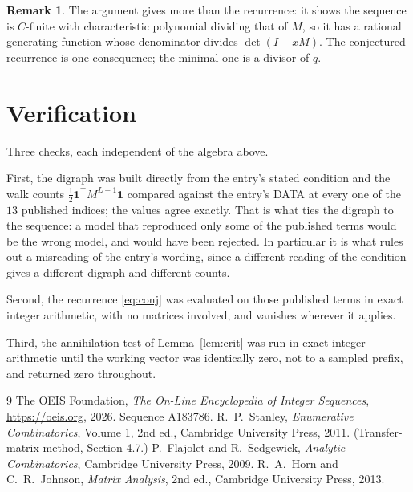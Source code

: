 \documentclass[11pt,a4paper]{article}
\theoremstyle{plain}
\theoremstyle{definition}
\newtheorem{remark}[theorem]{Remark}
\begin{document}
\begin{remark}
The argument gives more than the recurrence: it shows the sequence is $C$-finite with
characteristic polynomial dividing that of $M$, so it has a rational generating function
whose denominator divides $\det(I-xM)$. The conjectured recurrence is one consequence; the
minimal one is a divisor of $q$.
\end{remark}

\section{Verification}

Three checks, each independent of the algebra above.

First, the digraph was built directly from the entry's stated condition and the walk counts
$\tfrac1{2}\mathbf{1}^{\!\top}M^{L-1}\mathbf{1}$ compared against the entry's DATA at
every one of the $13$ published indices; the values agree exactly. That is what ties
the digraph to the sequence: a model that reproduced only some of the published terms would
be the wrong model, and would have been rejected. In particular it is what rules out a
misreading of the entry's wording, since a different reading of the condition gives a
different digraph and different counts.

Second, the recurrence \eqref{eq:conj} was evaluated on those published terms in exact
integer arithmetic, with no matrices involved, and vanishes wherever it applies.

Third, the annihilation test of Lemma~\ref{lem:crit} was run in exact integer arithmetic
until the working vector was identically zero, not to a sampled prefix, and returned zero
throughout.

\begin{thebibliography}{9}
 The OEIS Foundation, \emph{The On-Line Encyclopedia of Integer
Sequences}, \url{https://oeis.org}, 2026. Sequence A183786.
 R.~P.~Stanley, \emph{Enumerative Combinatorics}, Volume 1, 2nd ed.,
Cambridge University Press, 2011. (Transfer-matrix method, Section 4.7.)
 P.~Flajolet and R.~Sedgewick, \emph{Analytic Combinatorics}, Cambridge
University Press, 2009.
 R.~A.~Horn and C.~R.~Johnson, \emph{Matrix Analysis}, 2nd ed., Cambridge
University Press, 2013.
\end{thebibliography}
\end{document}
